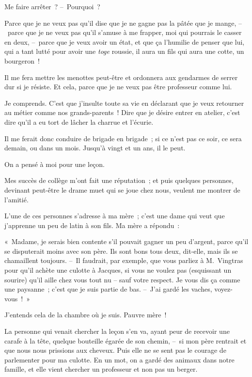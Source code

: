 \documentclass[french,twoside]{book} %
\begin{document}
\bigbreak
\noindent Me faire arrêter ? – Pourquoi ?\par
Parce que je ne veux pas qu’il dise que je ne gagne pas la pâtée que je mange, – parce que je ne veux pas qu’il s’amuse à me frapper, moi qui pourrais le casser en deux, – parce que je veux avoir un état, et que ça l’humilie de penser que lui, qui a tant lutté pour avoir une \emph{toge} roussie, il aura un fils qui aura une cotte, un bourgeron !\par
Il me fera mettre les menottes peut-être et ordonnera aux gendarmes de serrer dur si je résiste. Et cela, parce que je ne veux pas être professeur comme lui.\par
Je comprends. C’est que j’insulte toute sa vie en déclarant que je veux retourner au métier comme nos grands-parents ! Dire que je désire entrer en atelier, c’est dire qu’il a eu tort de lâcher la charrue et l’écurie.\par
Il me ferait donc conduire de brigade en brigade ; si ce n’est pas ce soir, ce sera demain, ou dans un mois. Jusqu’à vingt et un ans, il le peut.\par
On a pensé à moi pour une leçon.\par
Mes succès de collège m’ont fait une réputation ; et puis quelques personnes, devinant peut-être le drame muet qui se joue chez nous, veulent me montrer de l’amitié.\par
L’une de ces personnes s’adresse à ma mère ; c’est une dame qui veut que j’apprenne un peu de latin à son fils. Ma mère a répondu :\par
« Madame, je serais bien contente s’il pouvait gagner un peu d’argent, parce qu’il se disputerait moins avec son père. Ils sont bons tous deux, dit-elle, mais ils se chamaillent toujours. – Il faudrait, par exemple, que vous parliez à M. Vingtras pour qu’il achète une culotte à Jacques, si vous ne voulez pas (esquissant un sourire) qu’il aille chez vous tout nu – sauf votre respect. Je vous dis ça comme une paysanne ; c’est que je suis partie de bas. – J’ai gardé les vaches, voyez-vous ! »\par
J’entends cela de la chambre où je suis. Pauvre mère !\par
\bigbreak
\noindent La personne qui venait chercher la leçon s’en va, ayant peur de recevoir une carafe à la tête, quelque bouteille égarée de son chemin, – si mon père rentrait et que nous nous prissions aux cheveux. Puis elle ne se sent pas le courage de parlementer pour ma culotte. En un mot, on a gardé des animaux dans notre famille, et elle vient chercher un professeur et non pas un berger.\par
\end{document}
